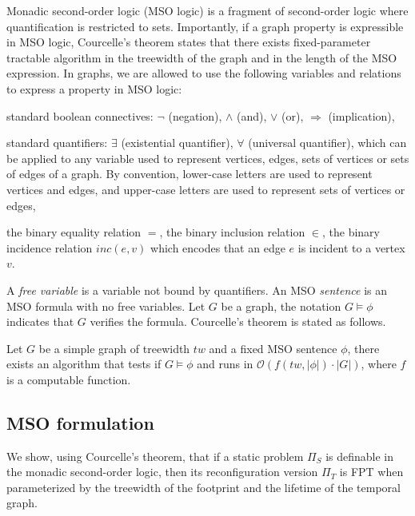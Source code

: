 Monadic second-order logic (MSO logic) is a fragment of second-order logic where quantification is restricted to sets. Importantly, if a graph property is expressible in MSO logic, Courcelle's theorem states that there exists fixed-parameter tractable algorithm in the treewidth of the graph and in the length of the MSO expression.
%
In graphs, we are allowed to use the following variables and relations to express a property in MSO logic:

\begin{compactitem}
  \item standard boolean connectives: $\neg$ (negation), $\wedge$ (and), $\vee$ (or), $\Rightarrow$ (implication),
  \item standard quantifiers: $\exists$ (existential quantifier), $\forall$ (universal quantifier), which can be applied to any variable used to represent vertices, edges, sets of vertices or sets of edges of a graph. By convention, lower-case letters are used to represent vertices and edges, and upper-case letters are used to represent sets of vertices or edges,
  \item the binary equality relation $=$, the binary inclusion relation $\in$, the binary incidence relation $inc(e,v)$ which encodes that an edge $e$ is incident to a vertex $v$.
\end{compactitem}

A \emph{free variable} is a variable not bound by quantifiers. An MSO \emph{sentence} is an MSO formula with no free variables. Let $G$ be a graph, the notation $G\models \phi$ indicates that $G$ verifies the formula. Courcelle's theorem is stated as follows.


\begin{theorem}
  \label{theorem:courcelle} Let $G$ be a simple graph of treewidth $tw$ and a fixed MSO sentence $\phi$, there exists an algorithm that tests if $G\models \phi$ and runs in $\mathcal{O}(f(tw,|\phi|) \cdot |G|)$, where $f$ is a computable function.
\end{theorem}


\subsection{MSO formulation}

We show, using Courcelle's theorem, that if a static problem $\Pi_S$ is definable in the monadic second-order logic, then its reconfiguration version $\Pi_T$ is FPT when parameterized by the treewidth of the footprint and the lifetime of the temporal graph.

